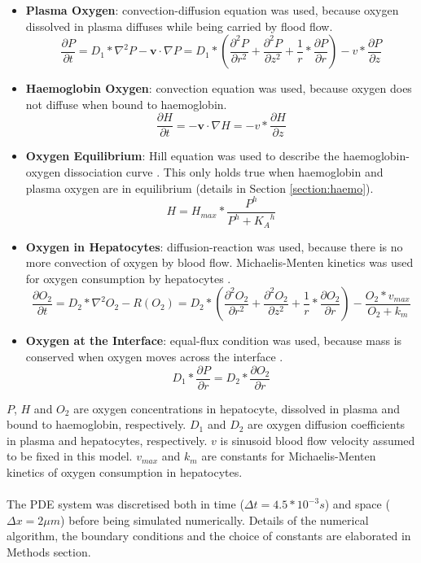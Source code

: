 \documentclass[12pt]{article}
\begin{document}
\begin{itemize}
    \item \textbf{Plasma Oxygen}: convection-diffusion equation was used, because oxygen dissolved in plasma diffuses while being carried by flood flow. \[\frac{\partial P}{\partial t}=D_1*\nabla^2P-\boldsymbol{v}\cdot \nabla P=D_1*(\frac{\partial^2 P}{\partial r^2}+\frac{\partial^2 P}{\partial z^2}+\frac{1}{r}*\frac{\partial P}{\partial r})-v*\frac{\partial P}{\partial z}\]
\item \textbf{Haemoglobin Oxygen}: convection equation was used, because oxygen does not diffuse when bound to haemoglobin. \[\frac{\partial H}{\partial t}=-\boldsymbol{v}\cdot \nabla H=-v*\frac{\partial H}{\partial z}\]
\item \textbf{Oxygen Equilibrium}: Hill equation was used to describe the haemoglobin-oxygen dissociation curve \cite{leowConfigurationHemoglobinOxygen2007}. This only holds true when haemoglobin and plasma oxygen are in equilibrium (details in Section \ref{section:haemo}).
\[H=H_{max}*\frac{{P}^{h}}{{P}^{h}+{K_A}^{h}}
\]
\item \textbf{Oxygen in Hepatocytes}: diffusion-reaction was used, because there is no more convection of oxygen by blood flow. Michaelis-Menten kinetics was used for oxygen consumption by hepatocytes \cite{leedaleSilicoguidedOptimisationOxygen2019}. \[\frac{\partial O_2}{\partial t}=D_2*\nabla^2O_2-R(O_2)=D_2*(\frac{\partial^2 O_2}{\partial r^2}+\frac{\partial^2 O_2}{\partial z^2}+\frac{1}{r}*\frac{\partial O_2}{\partial r})-\frac{O_2*v_{max}}{O_2+k_m}\]
\item\textbf{Oxygen at the Interface}: equal-flux condition was used, because mass is conserved when oxygen moves across the interface \cite{leedaleSilicoguidedOptimisationOxygen2019}.\[D_1*\frac{\partial P}{\partial r}=D_2*\frac{\partial O_2}{\partial r}\]
\end{itemize}
 $P$, $H$ and $O_2$ are oxygen concentrations in hepatocyte, dissolved in plasma and bound to haemoglobin, respectively. $D_1$ and $D_2$ are oxygen diffusion coefficients in plasma and hepatocytes, respectively. $v$ is sinusoid blood flow velocity assumed to be fixed in this model. $v_{max}$ and $k_m$ are constants for Michaelis-Menten kinetics of oxygen consumption in hepatocytes.\\\\The PDE system was discretised both in time ($\Delta t=4.5*10^{-3}s$) and space ($\Delta x=2 \mu m$) before being simulated numerically. Details of the numerical algorithm, the boundary conditions and the choice of constants are elaborated in Methods section.
\end{document}
